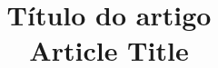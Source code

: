 \documentclass[12pt]{article}
\title{Título do artigo\\Article Title} %
\date{} %
\begin{document}
\maketitle
\onehalfspacing

\printbibliography
\end{document}
